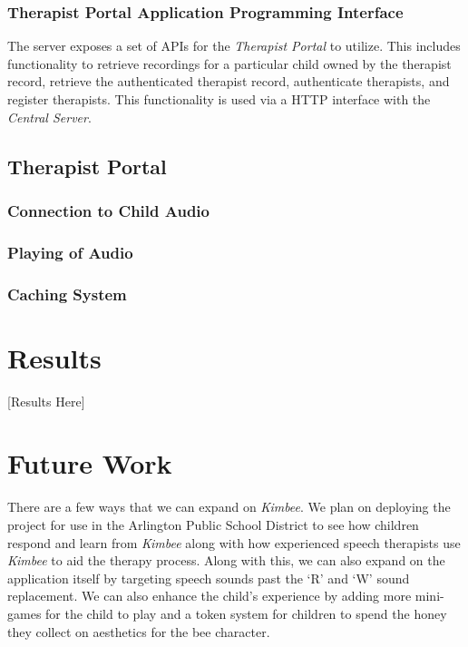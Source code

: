 \documentclass{sig-alternate-2013}
\begin{document}
\subsubsection{Therapist Portal Application Programming Interface}
  The server exposes a set of APIs for the {\em Therapist Portal} to utilize. This includes functionality to retrieve recordings for a particular child owned by the therapist record, retrieve the authenticated therapist record, authenticate therapists, and register therapists. This functionality is used via a HTTP interface with the {\em Central Server}.

\subsection{Therapist Portal}

\subsubsection{Connection to Child Audio}

\subsubsection{Playing of Audio}

\subsubsection{Caching System}


\section{Results}

[Results Here]

\section{Future Work}

There are a few ways that we can expand on {\em Kimbee}. We plan on deploying the project for use in the Arlington Public School District to see how children respond and learn from {\em Kimbee} along with how experienced speech therapists use {\em Kimbee} to aid the therapy process. Along with this, we can also expand on the application itself by targeting speech sounds past the `R' and `W' sound replacement. We can also enhance the child's experience by adding more mini-games for the child to play and a token system for children to spend the honey they collect on aesthetics for the bee character.
\end{document}
